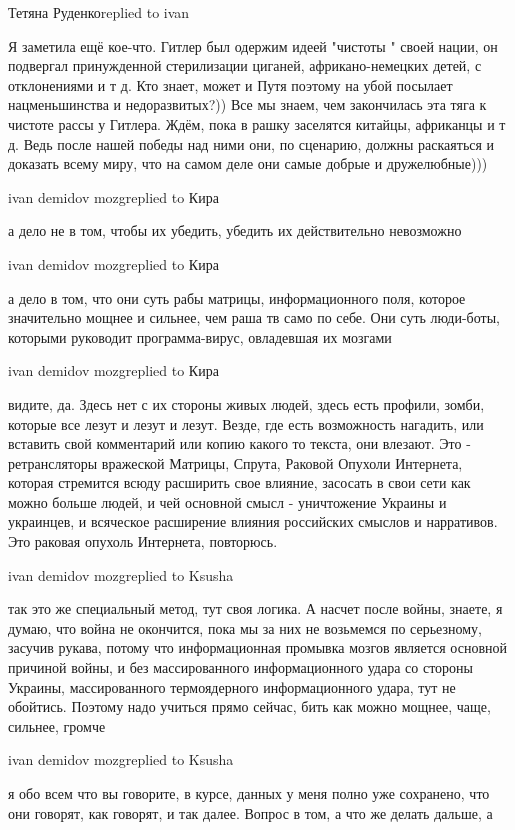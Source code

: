  
 
 
 
 


Тетяна Руденкоreplied to ivan

Я заметила ещё кое-что. Гитлер был одержим идеей "чистоты " своей нации, он
подвергал принужденной стерилизации циганей, африкано-немецких детей, с
отклонениями и т д. Кто знает, может и Путя поэтому на убой посылает
нацменьшинства и недоразвитых?)) Все мы знаем, чем закончилась эта тяга к
чистоте рассы у Гитлера. Ждём, пока в рашку заселятся китайцы, африканцы и т д.
Ведь после нашей победы над ними они, по сценарию, должны раскаяться и доказать
всему миру, что на самом деле они самые добрые и дружелюбные)))

ivan demidov mozgreplied to Кира

а дело не в том, чтобы их убедить, убедить их действительно невозможно

ivan demidov mozgreplied to Кира

а дело в том, что они суть рабы матрицы, информационного поля, которое
значительно мощнее и сильнее, чем раша тв само по себе. Они суть люди-боты,
которыми руководит программа-вирус, овладевшая их мозгами

ivan demidov mozgreplied to Кира

видите, да. Здесь нет с их стороны живых людей, здесь есть профили, зомби,
которые все лезут и лезут и лезут. Везде, где есть возможность нагадить, или
вставить свой комментарий или копию какого то текста, они влезают. Это -
ретрансляторы вражеской Матрицы, Спрута, Раковой Опухоли Интернета, которая
стремится всюду расширить свое влияние, засосать в свои сети как можно больше
людей, и чей основной смысл - уничтожение Украины и украинцев, и всяческое
расширение влияния российских смыслов и нарративов. Это раковая опухоль
Интернета, повторюсь.

ivan demidov mozgreplied to Ksusha

так это же специальный метод, тут своя логика. А насчет после войны, знаете, я
думаю, что война не окончится, пока мы за них не возьмемся по серьезному,
засучив рукава, потому что информационная промывка мозгов является основной
причиной войны, и без массированного информационного удара со стороны Украины,
массированного термоядерного информационного удара, тут не обойтись. Поэтому
надо учиться прямо сейчас, бить как можно мощнее, чаще, сильнее, громче

ivan demidov mozgreplied to Ksusha

я обо всем что вы говорите, в курсе, данных у меня полно уже сохранено, что они
говорят, как говорят, и так далее. Вопрос в том, а что же делать дальше, а

